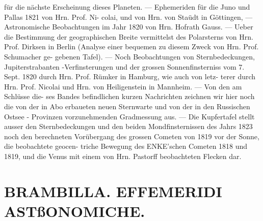 \documentclass[12pt,a4paper]{article}
\begin{document}
{{{{{{{{für  die nächste  Erscheinung  dieses  Planeten.  ---  Ephemeriden  für  die  Juno  und  Pallas  1821  von  Hrn.  Prof.  Ni- colai, und  von  Hrn.  von  Staüdt  in  Göttingen,  ---  Astronomische  Beobachtungen  im  Jahr  1820  von  Hrn. Hofrath  Gauss.  ---  Ueber  die  Bestimmung  der  geographischen  Breite  vermittelst  des  Polarsterns  von Hrn.  Prof.  Dirksen  in  Berlin  (Analyse  einer  bequemen  zu  diesem  Zweck  von  Hrn.  Prof.  Schumacher  ge- gebenen Tafel).  ---  Noch  Beobachtungen  von  Sternbedeckungen,  Jupiterstrabanten -Verfinsterungen  und der  grossen  Sonnenfinsterniss  vom  7.  Sept.  1820  durch  Hrn.  Prof.  Rümker  in  Hamburg,  wie  auch  von  letz- terer durch  Hrn.  Prof.  Nicolai  und  Hrn.  von  Heiligenstein  in  Mannheim.  ---  Von  den  am  Schlüsse  die- ses Bandes  befindlichen  kurzen  Nachrichten  zeichnen  wir  hier  noch  die  von  der  in  Abo  erbaueten  neuen Sternwarte  und  von  der  in  den  Russischen  Ostsee  -  Provinzen  vorzunehmenden  Gradmessung  aus.  ---  Die Kupfertafel  stellt  ausser  den  Sternbedeckungen  und  den  beiden  Mondfinsternissen  des  Jahrs  1823  noch den  berechneten  Vorübergang  des  grossen  Cometen  von  1819  vor  der  Sonne,  die  beobachtete  geocen- triche  Bewegung  des  ENKE'schen  Cometen  1818  und  1819,  und  die  Venus  mit  einem  von  Hrn.  Pastorff beobachteten  Flecken  dar.


\section*{BRAMBILLA.      EFFEMERIDI  ASTßONOMICHE.}

}}}}}}}}
\end{document}
